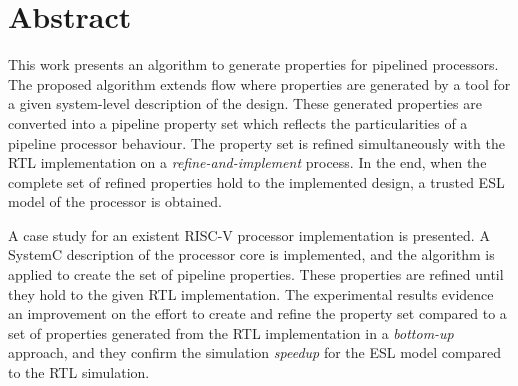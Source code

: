 \chapter{Abstract}

This work presents an algorithm to generate properties for pipelined processors. The proposed algorithm extends  flow where  properties are generated by a tool for a given system-level description of the design. These generated properties are converted into a pipeline property set which reflects the particularities of a pipeline processor behaviour. The property set is refined simultaneously with the RTL implementation on a \textit{refine-and-implement} process. In the end, when the complete set of refined properties hold to the implemented design, a trusted ESL model of the processor is obtained.  

A case study for an existent RISC-V processor implementation is presented. A SystemC description of the processor core is implemented, and the algorithm is applied to create the set of pipeline properties. These properties are refined until they hold to the given RTL implementation. The experimental results evidence an improvement  on the effort to create and refine the property set compared to a set of properties generated from the RTL implementation in a \textit{bottom-up} approach, and they confirm the simulation \textit{speedup} for the ESL model compared to the RTL simulation.

